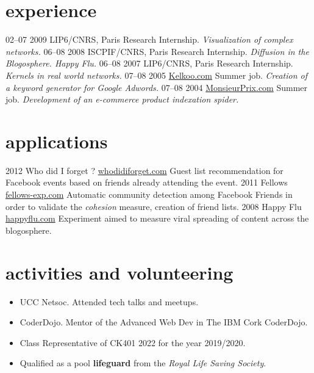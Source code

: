 \documentclass[]{friggeri-cv}
\begin{document}
\section{experience}

\begin{entrylist}
  \entry
    {02–07 2009}
    {LIP6/CNRS, Paris}
    {Research Internship.}
    {\emph{Visualization of complex networks.}}
  \entry
    {06–08 2008}
    {ISCPIF/CNRS, Paris}
    {Research Internship.}
    {\emph{Diffusion in the Blogosphere. Happy Flu.}}
  \entry
    {06–08 2007}
    {LIP6/CNRS, Paris}
    {Research Internship.}
    {\emph{Kernels in real world networks.}}
  \entry
    {07–08 2005}
    {\href{http://www.kelkoo.com}{Kelkoo.com}}
    {Summer job.}
    {\emph{Creation of a keyword generator for Google Adwords.}}
  \entry
    {07–08 2004}
    {\href{http://www.monsieurprix.com}{MonsieurPrix.com}}
    {Summer job.}
    {\emph{Development of an e-commerce product indexation spider.}}
\end{entrylist}

\section{applications}

\begin{entrylist}
  \entry
    {2012}
    {Who did I forget ?}
    {\href{http://whodidiforget.com}{whodidiforget.com}}
    {Guest list recommendation for Facebook events based on friends already attending the event.}
  \entry
    {2011}
    {Fellows}
    {\href{http://fellows-exp.com}{fellows-exp.com}}
    {Automatic community detection among Facebook Friends in order to validate the \emph{cohesion} measure, creation of friend lists.}
  \entry
    {2008}
    {Happy Flu}
    {\href{http://happyflu.com}{happyflu.com}}
    {Experiment aimed to measure viral spreading of content across the blogosphere.}
\end{entrylist}

\section{activities and volunteering}
\begin{itemize}
    \item UCC Netsoc. Attended tech talks and meetups.
    \item CoderDojo. Mentor of the Advanced Web Dev in The IBM Cork CoderDojo.
    \item Class Representative of CK401 2022 for the year 2019/2020.
    \item Qualified as a pool \textbf{lifeguard} from the \textit{Royal Life Saving Society}.
\end{itemize}
\end{document}
